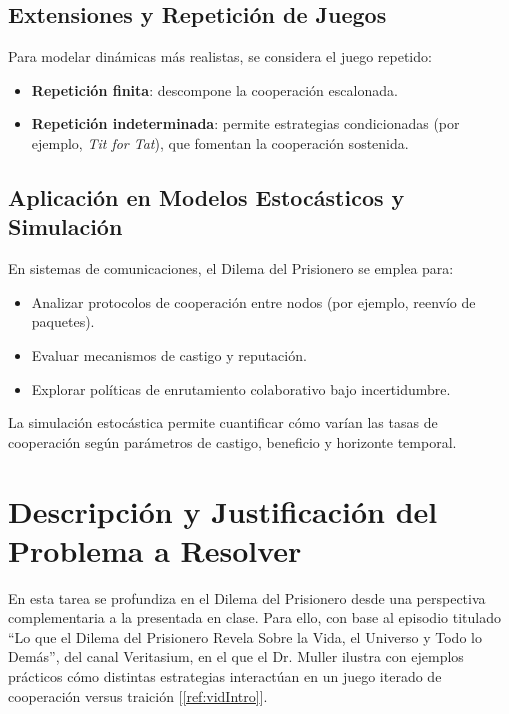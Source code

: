 \documentclass{article}
\begin{document}
\subsection{Extensiones y Repetición de Juegos}
Para modelar dinámicas más realistas, se considera el juego repetido:

\begin{itemize}
  \item \textbf{Repetición finita}: descompone la cooperación escalonada.
  \item \textbf{Repetición indeterminada}: permite estrategias condicionadas 
    (por ejemplo, \emph{Tit for Tat}), que fomentan la cooperación sostenida.
\end{itemize}

\subsection{Aplicación en Modelos Estocásticos y Simulación}
En sistemas de comunicaciones, el Dilema del Prisionero se emplea para:

\begin{itemize}
  \item Analizar protocolos de cooperación entre nodos (por ejemplo, reenvío de paquetes).
  \item Evaluar mecanismos de castigo y reputación.
  \item Explorar políticas de enrutamiento colaborativo bajo incertidumbre.
\end{itemize}

La simulación estocástica permite cuantificar cómo varían las tasas de cooperación 
según parámetros de castigo, beneficio y horizonte temporal.


\section{Descripción y Justificación del Problema a Resolver}\label{sec:descr}

En esta tarea se profundiza en el Dilema del Prisionero desde una perspectiva complementaria a 
la presentada en clase. Para ello, con base al episodio titulado “Lo que el Dilema del 
Prisionero Revela Sobre la Vida, el Universo y Todo lo Demás”, del canal Veritasium, en el 
que el Dr. Muller ilustra con ejemplos prácticos cómo distintas estrategias interactúan en 
un juego iterado de cooperación versus traición [\ref{ref:vidIntro}].
\end{document}

